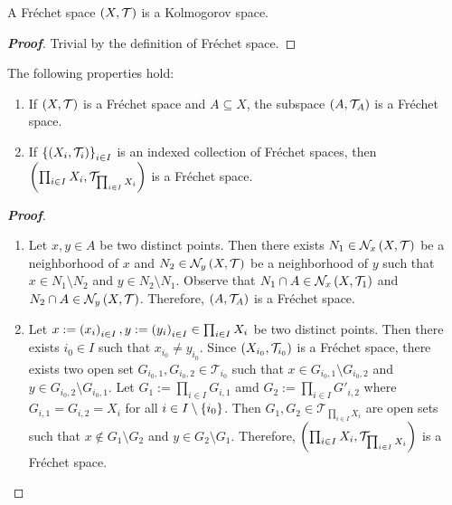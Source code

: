 \begin{proposition}
  A Fréchet space $\left(X,\mathcal{T}\right)$ is a Kolmogorov space.
  \begin{proof}[\rm\textbf{Proof}]
    Trivial by the definition of Fréchet space.
  \end{proof}
\end{proposition}

\begin{proposition}
  The following properties hold:

  \begin{enumerate}
    \item If $\left(X,\mathcal{T}\right)$ is a Fréchet space and $A\subseteq X$, the subspace $\left(A,\mathcal{T}_A\right)$ is a Fréchet space.
    \item If $\left\{\left(X_i,\mathcal{T}_i\right)\right\}_{i\in I}$ is an indexed collection of Fréchet spaces, then $\left(\prod_{i\in I}{X_i},\mathcal{T}_{\prod_{i\in I}{X_i}}\right)$ is a Fréchet space.
  \end{enumerate}
  
  \begin{proof}[\rm\textbf{Proof}]
    \hfill
    \begin{enumerate}
      \item Let $x,y\in A$ be two distinct points. Then there exists $N_1\in\mathcal{N}_x\left(X,\mathcal{T}\right)$ be a neighborhood of $x$ and $N_2\in\mathcal{N}_y\left(X,\mathcal{T}\right)$ be a neighborhood of $y$ such that $x\in N_1\setminus N_2$ and $y\in N_2\setminus N_1$. Observe that $N_1\cap A\in\mathcal{N}_x\left(X,\mathcal{T}_1\right)$ and $N_2\cap A\in\mathcal{N}_y\left(X,\mathcal{T}\right)$. Therefore, $\left(A,\mathcal{T}_A\right)$ is a Fréchet space.
      \item Let $x:=\left(x_i\right)_{i\in I},y:=\left(y_i\right)_{i\in I}\in\prod_{i\in I}{X_i}$ be two distinct points. Then there exists $i_0\in I$ such that $x_{i_0}\neq y_{i_0}$. Since $\left(X_{i_0},\mathcal{T}_{i_0}\right)$ is a Fréchet space, there exists two open set $G_{i_0,1},G_{i_0,2}\in\mathcal{T}_{i_0}$ such that $x\in G_{i_0,1}\setminus G_{i_0,2}$ and $y\in G_{i_0,2}\setminus G_{i_0,1}$. Let $G_1:=\prod_{i\in I}{G_{i,1}}$ amd $G_2:=\prod_{i\in I}{G'_{i,2}}$ where $G_{i,1}=G_{i,2}=X_i$ for all $i\in I\setminus\left\{i_0\right\}$. Then $G_1,G_2\in\mathcal{T}_{\prod_{i\in I}{X_i}}$ are open sets such that $x\notin G_1\setminus G_2$ and $y\in G_2\setminus G_1$. Therefore, $\left(\prod_{i\in I}{X_i},\mathcal{T}_{\prod_{i\in I}{X_i}}\right)$ is a Fréchet space.
    \end{enumerate}
  \end{proof}
\end{proposition}

